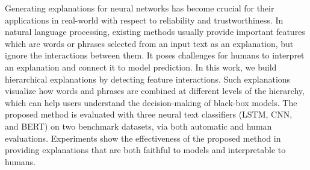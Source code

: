 Generating explanations for neural networks has become crucial for their applications in real-world with respect to reliability and trustworthiness. In natural language processing, existing methods usually provide important features which are words or phrases selected from an input text as an explanation, but ignore the interactions between them. It poses challenges for humans to interpret an explanation and connect it to model prediction. In this work, we build hierarchical explanations by detecting feature interactions. Such explanations visualize how words and phrases are combined at different levels of the hierarchy, which can help users understand the decision-making of black-box models. The proposed method is evaluated with three neural text classifiers (LSTM, CNN, and BERT) on two benchmark datasets, via both automatic and human evaluations. Experiments show the effectiveness of the proposed method in providing explanations that are both faithful to models and interpretable to humans.
